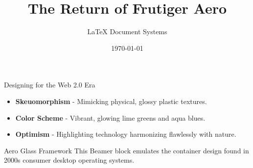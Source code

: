 \documentclass[aspectratio=169]{beamer}
\title{The Return of Frutiger Aero}
\author{LaTeX Document Systems}
\date{\today}
\begin{document}
\begin{frame}
    \titlepage
\end{frame}

\begin{frame}{Designing for the Web 2.0 Era}
    \begin{itemize}
        \item \textbf{Skeuomorphism} - Mimicking physical, glossy plastic textures.
        \item \textbf{Color Scheme} - Vibrant, glowing lime greens and aqua blues.
        \item \textbf{Optimism} - Highlighting technology harmonizing flawlessly with nature.
    \end{itemize}

    \vspace{0.4cm}

    \begin{block}{Aero Glass Framework}
        This Beamer block emulates the container design found in 2000s consumer desktop operating systems.
    \end{block}
\end{frame}
\end{document}
